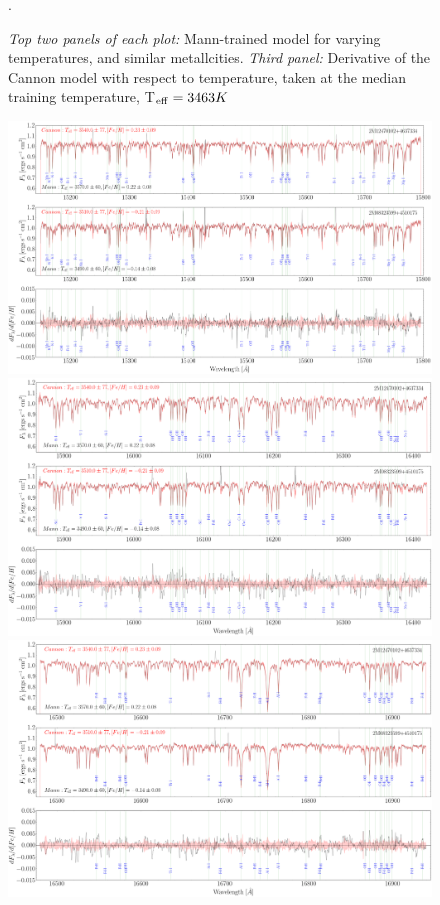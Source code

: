 \documentclass[modern]{aastex62}
\begin{document}
\begin{figure}[ht]
\begin{center}
\end{center}
\caption{\textit{Top two panels of each plot:} Mann-trained model for varying temperatures, and similar metallcities. \textit{Third panel:} Derivative of the Cannon model with respect to temperature, taken at the median training temperature, T$_{\rm eff}=3463 K$}. \label{fig:demo_teff}
\end{figure}

\begin{figure}[ht]
\begin{center}
\includegraphics[width=16cm]{figures/demo_derivatives_feh1.png}
\includegraphics[width=16cm]{figures/demo_derivatives_feh2.png}
\includegraphics[width=16cm]{figures/demo_derivatives_feh3.png}

\end{center}
\end{figure}
\end{document}
